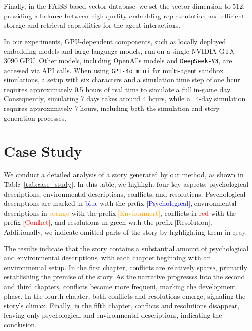 \documentclass[letterpaper]{article} %
\begin{document}
Finally, in the FAISS-based vector database, we set the vector dimension to 512, providing a balance between high-quality embedding representation and efficient storage and retrieval capabilities for the agent interactions.

In our experiments, GPU-dependent components, such as locally deployed embedding models and large language models, run on a single NVIDIA GTX 3090 GPU. Other models, including OpenAI's models and \texttt{DeepSeek-V3}, are accessed via API calls. When using \texttt{GPT-4o mini} for multi-agent sandbox simulations, a setup with six characters and a simulation time step of one hour requires approximately 0.5 hours of real time to simulate a full in-game day. Consequently, simulating 7 days takes around 4 hours, while a 14-day simulation requires approximately 7 hours, including both the simulation and story generation processes.

\section{Case Study}
\label{sec:case_study}

We conduct a detailed analysis of a story generated by our method, as shown in Table~\ref{tab:case_study}. In this table, we highlight four key aspects: psychological descriptions, environmental descriptions, conflicts, and resolutions. Psychological descriptions are marked in \textcolor{blue}{blue} with the prefix \textcolor{blue}{[Psychological]}, environmental descriptions in \textcolor{orange}{orange} with the prefix \textcolor{orange}{[Environment]}, conflicts in \textcolor{red}{red} with the prefix \textcolor{red}{[Conflict]}, and resolutions in \textcolor{resolu_color}{green} with the prefix \textcolor{resolu_color}{[Resolution]}. Additionally, we indicate omitted parts of the story by highlighting them in \textcolor{gray}{gray}.

The results indicate that the story contains a substantial amount of psychological and environmental descriptions, with each chapter beginning with an environmental setup. In the first chapter, conflicts are relatively sparse, primarily establishing the premise of the story. As the narrative progresses into the second and third chapters, conflicts become more frequent, marking the development phase. In the fourth chapter, both conflicts and resolutions emerge, signaling the story's climax. Finally, in the fifth chapter, conflicts and resolutions disappear, leaving only psychological and environmental descriptions, indicating the conclusion.  
\end{document}
